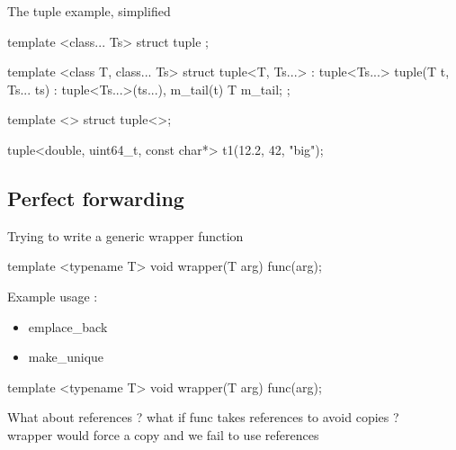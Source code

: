\begin{frame}[fragile]
  \begin{block}{The tuple example, simplified}
    \begin{cppcode*}{}
      template <class... Ts> struct tuple {};
      
      template <class T, class... Ts>
      struct tuple<T, Ts...> : tuple<Ts...> {
        tuple(T t, Ts... ts) :
          tuple<Ts...>(ts...), m_tail(t) {}
        T m_tail;
      };

      template <> struct tuple<>{};
      
      tuple<double, uint64_t, const char*>
        t1(12.2, 42, "big");
    \end{cppcode*}
  \end{block}
\end{frame}

\subsection[forward]{Perfect forwarding}

\begin{frame}[fragile]
  Trying to write a generic wrapper function
  \begin{cppcode*}{}
    template <typename T>
    void wrapper(T arg) {
      func(arg);
    }
  \end{cppcode*}
  Example usage :
  \begin{itemize}
  \item emplace\_back
  \item make\_unique
  \end{itemize}
\end{frame}

\begin{frame}[fragile]
  \begin{cppcode*}{}
    template <typename T>
    void wrapper(T arg) {
      func(arg);
    }
  \end{cppcode*}
  \begin{alertblock}{What about references ?}
    what if func takes references to avoid copies ?\\
    wrapper would force a copy and we fail to use references
  \end{alertblock}
\end{frame}

